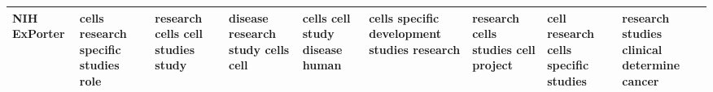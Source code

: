 \documentclass[11pt,a4paper]{article}
\begin{document}
\begin{appendices}
\begin{table}[htb]
\begin{tiny}
\begin{tabular}{|p{}|p{}|p{}|p{}|p{}|p{}|p{}|p{}|p{}|}
    NIH ExPorter & cells \newline research \newline specific \newline studies \newline role & research \newline cells \newline cell \newline studies \newline study & disease \newline research \newline study \newline cells \newline cell & cells \newline cell \newline study \newline disease \newline human & cells \newline specific \newline development \newline studies \newline research & research \newline cells \newline studies \newline cell \newline project & cell \newline research \newline cells \newline specific \newline studies & research \newline studies \newline clinical \newline determine \newline cancer\\\hline

\end{tabular}
\end{tiny}
\end{table}
\end{appendices}
\end{document}
